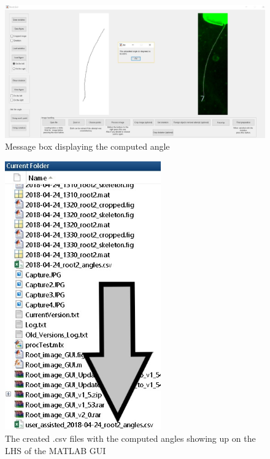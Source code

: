 \begin{figure}[H]
	\centering
	\includegraphics[width=\textwidth]{../Figures/manual/optionalE6.jpg}
	\caption{Message box displaying the computed angle}
	\label{fig:img67}
\end{figure}

\begin{figure}[H]
	\centering
	\includegraphics[width=0.6\textwidth]{../Figures/manual/optionalE7.jpg}
	\caption{The created .csv files with the computed angles showing up on the LHS of the MATLAB GUI}
	\label{fig:img68}
\end{figure}



